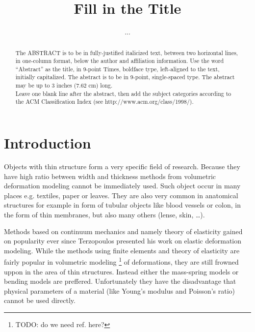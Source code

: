 \documentclass{egpubl}
\title[Short title]%
      {Fill in the Title} %
\author[...]
       {...} %
\begin{document}

\maketitle

\begin{abstract} %
   The ABSTRACT is to be in fully-justified italicized text, 
   between two horizontal lines,
   in one-column format, 
   below the author and affiliation information. 
   Use the word ``Abstract'' as the title, in 9-point Times, boldface type, 
   left-aligned to the text, initially capitalized. 
   The abstract is to be in 9-point, single-spaced type.
   The abstract may be up to 3 inches (7.62 cm) long. \\
   Leave one blank line after the abstract, 
   then add the subject categories according to the ACM Classification Index 
   (see http://www.acm.org/class/1998/).

\begin{classification} %
\end{classification}

\end{abstract}





\section{Introduction}

Objects with thin structure form a very specific field of research. Because
they have high ratio between width and thickness methods from volumetric
deformation modeling cannot be immediately used. Such object occur in many
places e.g. textiles, paper or leaves. They are also very common in
anatomical structures for example in form of tubular objects like blood
vessels or colon, in the form of thin membranes, but also many others
(lense, skin, \ldots).

Methods based on continuum mechanics and namely theory of elasticity gained
on popularity ever since Terzopoulos \cite{Terzopoulos1987} presented his
work on elastic deformation modeling. While the methods using finite
elements and theory of elasticity are fairly popular in volumetric modeling
\footnote{TODO: do we need ref. here?} of deformations, they are still
frowned uppon in the area of thin structures. Instead either the
mass-spring models \cite{Volino2009} or bending models
\cite{Grinspun2003,Choi2007} are preffered. Unfortunately they have the
disadvantage that physical parameters of a material (like Young's modulus
and Poisson's ratio) cannot be used directly.
\end{document}
